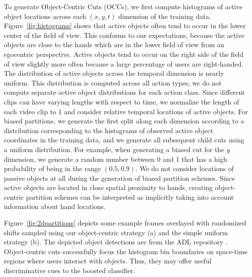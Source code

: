 \documentclass[12pt]{article} %
\begin{document}
  To generate Object-Centric Cuts (OCCs), we first compute histograms of active object
  locations across each $(x,y,t)$ dimension of the training data.
  Figure~\ref{fig:histograms} shows that active objects often tend to occur in the lower center
	of the field of view. This conforms to our expectations, because
	the active objects are close to the hands which are in the lower field of
	view from an egocentric perspective. Active objects tend to occur on the
  right side of the field of view slightly more often because a large
  percentage of users are right-handed.
  The distribution of active objects
  across the temporal dimension is nearly uniform. 
  This distribution is computed across all action types; we do not compute
  separate active object distributions for each action class.
  Since different clips can have
  varying lengths with respect to time, we normalize the length of each
  video clip to 1 and consider relative temporal locations of active
  objects. 
	For biased partitions, we generate
  the first split along each dimension according to a distribution
  corresponding to the histograms of observed active object coordinates in the training data,
  and we generate all subsequent child cuts using a uniform distribution.
  For example, when generating a biased cut for the $y$ dimension, 
  we generate a random number between 0 and 1 that has a high probability of
  being in the range $(0.5, 0.9)$.
  We do not consider locations of passive objects at all during the
  generation of biased partition schemes.
  Since active objects are located
  in close spatial proximity to hands, creating object-centric partition schemes can
  be interpreted as implicitly taking into account information about hand
  locations.



  Figure~\ref{fig:2dpartitions} depicts some example frames overlayed with
  randomized shifts sampled using our object-centric strategy (a) and the simple
  uniform strategy (b). The depicted object detections are from the ADL
  repository \cite{Ramanan12}. Object-centric cuts successfully focus the
  histogram bin boundaries on space-time regions where users interact with
  objects. Thus, they may offer useful discriminative cues to the boosted
  classifier.
\end{document}

